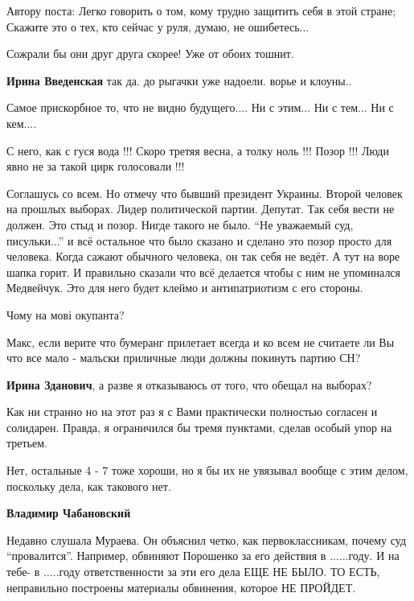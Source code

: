 \begin{itemize}
Автору поста:
Легко говорить о том, кому трудно защитить себя в этой стране;
Скажите это о тех, кто сейчас у руля, думаю, не ошибетесь...

Сожрали бы они друг друга скорее! Уже от обоих тошнит.

\textbf{Ирина Введенская} так да. до рыгачки уже надоели. ворье и клоуны..

Самое прискорбное то, что не видно будущего.... Ни с этим... Ни с тем... Ни с кем....


С него, как с гуся вода !!! Скоро третяя весна, а толку ноль !!! Позор !!! Люди
явно не за такой цирк голосовали !!!


Соглашусь со всем. Но отмечу что бывший президент Украины. Второй человек на
прошлых выборах. Лидер политической партии. Депутат. Так себя вести не должен.
Это стыд и позор. Нигде такого не было. \enquote{Не уважаемый суд, писульки...} и всё
остальное что было сказано и сделано это позор просто для человека. Когда
сажают обычного человека, он так себя не ведёт. А тут на воре шапка горит. И
правильно сказали что всё делается чтобы с ним не упоминался Медвейчук. Это для
него будет клеймо и антипатриотизм с его стороны.

Чому на мові окупанта?


Макс, если верите что бумеранг прилетает всегда и ко всем не считаете ли Вы что
все мало - мальски приличные люди должны покинуть партию СН?


\textbf{Ирина Зданович}, а разве я отказываюсь от того, что обещал на выборах?


Как ни странно но на этот раз я с Вами практически полностью согласен и
солидарен. Правда, я ограничился бы тремя пунктами, сделав особый упор на
третьем.

Нет, остальные 4 - 7 тоже хороши, но я бы их не увязывал вообще с этим делом,
поскольку дела, как такового нет.

\begin{itemize} %
\textbf{Владимир Чабановский} 

Недавно слушала Мураева. Он объяснил четко, как первоклассникам, почему суд
\enquote{провалится}. Например, обвиняют Порошенко за его действия в ......году. И на
тебе- в .....году ответственности за эти его дела ЕЩЕ НЕ БЫЛО. ТО
ЕСТЬ, неправильно построены материалы обвинения, которое НЕ ПРОЙДЕТ.


\end{itemize}
\end{itemize}
